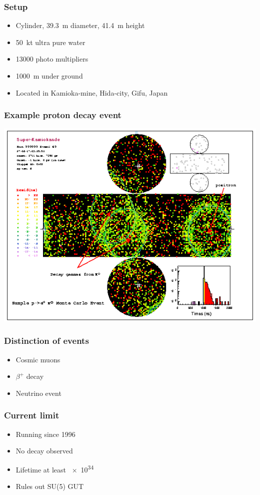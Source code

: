 \documentclass[english, fleqn]{beamer}
\begin{document}
\begin{frame}
    \frametitle{Setup}

    \begin{itemize}
        \item Cylinder, \SI{39.3}{\meter} diameter, \SI{41.4}{\meter} height
        \item \SI{50}{\kilo\tonne} ultra pure water
        \item \num{13000} photo multipliers
        \item \SI{1000}{\meter} under ground
        \item Located in Kamioka-mine, Hida-city, Gifu, Japan
    \end{itemize}

    \parencite{super-k/overview}
\end{frame}

\begin{frame}
    \frametitle{Example proton decay event}

    \centering
    \includegraphics[width=0.8\linewidth]{Figures/epi0_nice_event.png}
    \parencite{boston_university/proton_decay}
\end{frame}

\begin{frame}
    \frametitle{Distinction of events}

    \begin{itemize}
        \item Cosmic muons
        \item $\beta^+$ decay
        \item Neutrino event
    \end{itemize}
\end{frame}

\begin{frame}
    \frametitle{Current limit}

    \begin{itemize}
        \item Running since 1996
        \item No decay observed
            \pause
        \item Lifetime at least \SI{e34}{\year}
        \item Rules out SU(5) GUT
    \end{itemize}

    \parencite{super-k/proton_decay}
\end{frame}
\end{document}
